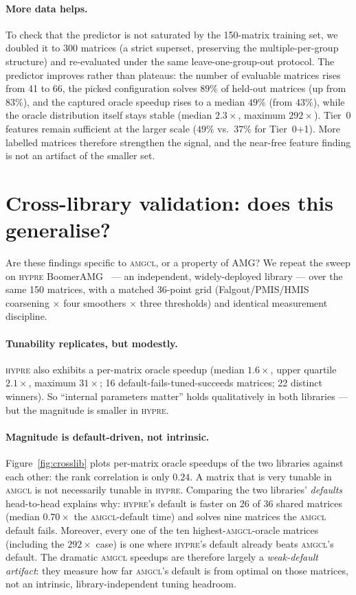 \documentclass[11pt]{article}
\newcommand{\amgcl}{\textsc{amgcl}}
\newcommand{\hypre}{\textsc{hypre}}
\begin{document}
\paragraph{More data helps.}
To check that the predictor is not saturated by the 150-matrix training set,
we doubled it to 300 matrices (a strict superset, preserving the
multiple-per-group structure) and re-evaluated under the same
leave-one-group-out protocol. The predictor improves rather than plateaus: the
number of evaluable matrices rises from 41 to 66, the picked configuration
solves $89\%$ of held-out matrices (up from $83\%$), and the captured oracle
speedup rises to a median $49\%$ (from $43\%$), while the oracle distribution
itself stays stable (median $2.3\times$, maximum $292\times$). Tier~0 features
remain sufficient at the larger scale ($49\%$ vs.\ $37\%$ for Tier~0+1). More
labelled matrices therefore strengthen the signal, and the near-free feature
finding is not an artifact of the smaller set.

\section{Cross-library validation: does this generalise?}
\label{sec:crosslib}

Are these findings specific to \amgcl{}, or a property of AMG? We repeat the
sweep on \hypre{} BoomerAMG~\cite{henson2002} --- an independent,
widely-deployed library --- over the same 150 matrices, with a matched 36-point
grid (Falgout/PMIS/HMIS coarsening $\times$ four smoothers $\times$ three
thresholds) and identical measurement discipline.

\paragraph{Tunability replicates, but modestly.}
\hypre{} also exhibits a per-matrix oracle speedup (median $1.6\times$, upper
quartile $2.1\times$, maximum $31\times$; 16 default-fails-tuned-succeeds
matrices; 22 distinct winners). So ``internal parameters matter'' holds
qualitatively in both libraries --- but the magnitude is smaller in \hypre{}.

\paragraph{Magnitude is default-driven, not intrinsic.}
Figure~\ref{fig:crosslib} plots per-matrix oracle speedups of the two libraries
against each other: the rank correlation is only $0.24$. A matrix that is very
tunable in \amgcl{} is not necessarily tunable in \hypre{}. Comparing the two
libraries' \emph{defaults} head-to-head explains why: \hypre{}'s default is
faster on 26 of 36 shared matrices (median $0.70\times$ the \amgcl{}-default
time) and solves nine matrices the \amgcl{} default fails. Moreover, every one
of the ten highest-\amgcl{}-oracle matrices (including the $292\times$ case) is
one where \hypre{}'s default already beats \amgcl{}'s default. The dramatic
\amgcl{} speedups are therefore largely a \emph{weak-default artifact}: they
measure how far \amgcl{}'s default is from optimal on those matrices, not an
intrinsic, library-independent tuning headroom.
\end{document}
